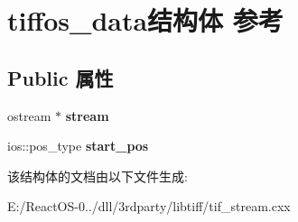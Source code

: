 \hypertarget{structtiffos__data}{}\section{tiffos\+\_\+data结构体 参考}
\label{structtiffos__data}
\subsection*{Public 属性}
\begin{DoxyCompactItemize}
\item 
\mbox{\label{structtiffos__data_a2fb3fa874dd2d4b57d34505682b9ddd2}} 
ostream $\ast$ {\bfseries stream}
\item 
\mbox{\label{structtiffos__data_aba08d933646e994a8ba5463c012b1fda}} 
ios\+::pos\+\_\+type {\bfseries start\+\_\+pos}
\end{DoxyCompactItemize}


该结构体的文档由以下文件生成\+:\begin{DoxyCompactItemize}
\item 
E\+:/\+React\+O\+S-\/0../dll/3rdparty/libtiff/tif\+\_\+stream.\+cxx\end{DoxyCompactItemize}
